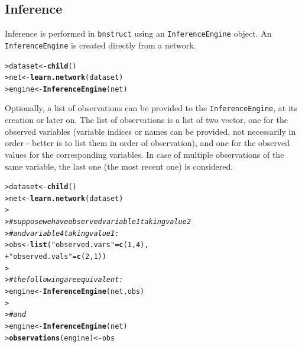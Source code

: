 \documentclass{article}\usepackage[]{graphicx}\usepackage[]{color}
\makeatletter
\newcommand{\hlnum}[1]{\textcolor[rgb]{0.686,0.059,0.569}{#1}}%
\newcommand{\hlstr}[1]{\textcolor[rgb]{0.192,0.494,0.8}{#1}}%
\newcommand{\hlcom}[1]{\textcolor[rgb]{0.678,0.584,0.686}{\textit{#1}}}%
\newcommand{\hlstd}[1]{\textcolor[rgb]{0.345,0.345,0.345}{#1}}%
\newcommand{\hlkwb}[1]{\textcolor[rgb]{0.69,0.353,0.396}{#1}}%
\newcommand{\hlkwd}[1]{\textcolor[rgb]{0.737,0.353,0.396}{\textbf{#1}}}%
\newenvironment{kframe}{%
 \def\at@end@of@kframe{}%
 \ifinner\ifhmode%
  \def\at@end@of@kframe{\end{minipage}}%
  \begin{minipage}{\columnwidth}%
 \fi\fi%
 \def\FrameCommand##1{\hskip\@totalleftmargin \hskip-\fboxsep
 \colorbox{shadecolor}{##1}\hskip-\fboxsep
     \hskip-\linewidth \hskip-\@totalleftmargin \hskip\columnwidth}%
 \MakeFramed {\advance\hsize-\width
   \@totalleftmargin\z@ \linewidth\hsize
   \@setminipage}}%
 {\par\unskip\endMakeFramed%
 \at@end@of@kframe}
\newenvironment{knitrout}{}{} %
\newcommand{\Robject}[1]{{\texttt{#1}}}
\newcommand{\Rpackage}[1]{{\texttt{#1}}}
\makeatother
\begin{document}
\subsection{Inference}\label{sec:infengine}
Inference is performed in \Rpackage{bnstruct} using an \Robject{InferenceEngine} object. An \Robject{InferenceEngine}
is created directly from a network.
\begin{knitrout}
\color{fgcolor}\begin{kframe}
\begin{alltt}
\hlstd{> }\hlstd{dataset} \hlkwb{<-} \hlkwd{child}\hlstd{()}
\hlstd{> }\hlstd{net}     \hlkwb{<-} \hlkwd{learn.network}\hlstd{(dataset)}
\hlstd{> }\hlstd{engine}  \hlkwb{<-} \hlkwd{InferenceEngine}\hlstd{(net)}
\end{alltt}
\end{kframe}
\end{knitrout}

Optionally, a list of observations can be provided to the \Robject{InferenceEngine}, at its creation or later on.
The list of observations is a list of two vector, one for the observed variables
(variable indices or names can be provided, not necessarily in order - better is to list them in order of observation),
and one for the observed values for the corresponding variables. In case of multiple observations of the same variable, the last one (the most recent one) is considered.

\begin{knitrout}
\color{fgcolor}\begin{kframe}
\begin{alltt}
\hlstd{> }\hlstd{dataset} \hlkwb{<-} \hlkwd{child}\hlstd{()}
\hlstd{> }\hlstd{net}     \hlkwb{<-} \hlkwd{learn.network}\hlstd{(dataset)}
\hlstd{> }
\hlstd{> }\hlcom{# suppose we have observed variable 1 taking value 2}
\hlstd{> }\hlcom{# and variable 4 taking value 1:}
\hlstd{> }\hlstd{obs} \hlkwb{<-} \hlkwd{list}\hlstd{(}\hlstr{"observed.vars"} \hlstd{=} \hlkwd{c}\hlstd{(}\hlnum{1}\hlstd{,}\hlnum{4}\hlstd{),}
\hlstd{+ }            \hlstr{"observed.vals"} \hlstd{=} \hlkwd{c}\hlstd{(}\hlnum{2}\hlstd{,}\hlnum{1}\hlstd{))}
\hlstd{> }
\hlstd{> }\hlcom{# the following are equivalent:}
\hlstd{> }\hlstd{engine}  \hlkwb{<-} \hlkwd{InferenceEngine}\hlstd{(net, obs)}
\hlstd{> }
\hlstd{> }\hlcom{# and}
\hlstd{> }\hlstd{engine}  \hlkwb{<-} \hlkwd{InferenceEngine}\hlstd{(net)}
\hlstd{> }\hlkwd{observations}\hlstd{(engine)} \hlkwb{<-} \hlstd{obs}
\end{alltt}
\end{kframe}
\end{knitrout}
\end{document}
